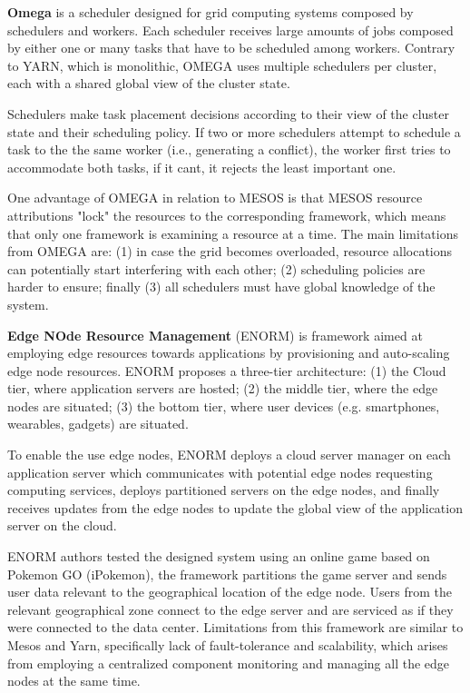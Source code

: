 \textbf{Omega} \cite{41684} is a scheduler designed for grid computing systems composed by schedulers and workers. Each scheduler receives large amounts of jobs composed by either one or many tasks that have to be scheduled among workers. Contrary to YARN, which is monolithic, OMEGA uses multiple schedulers per cluster, each with a shared global view of the cluster state.

Schedulers make task placement decisions according to their view of the cluster state and their scheduling policy. If two or more schedulers attempt to schedule a task to the the same worker (i.e., generating a conflict), the worker first tries to accommodate both tasks, if it cant, it rejects the least important one.

One advantage of OMEGA in relation to MESOS is that MESOS resource attributions "lock" the resources to the corresponding framework,  which means that only one framework is examining a resource at a time. The main limitations from OMEGA are: (1) in case the grid becomes overloaded, resource allocations can potentially start interfering with each other; (2) scheduling policies are harder to ensure; finally (3) all schedulers must have global knowledge of the system.

\textbf{Edge NOde Resource Management} \cite{wang2017enorm} (ENORM) is framework aimed at employing edge resources towards applications by provisioning and auto-scaling edge node resources. ENORM proposes a three-tier architecture: (1) the Cloud tier, where application servers are hosted; (2) the middle tier, where the edge nodes are situated; (3) the bottom tier, where user devices (e.g. smartphones, wearables, gadgets) are situated. 

To enable the use edge nodes, ENORM deploys a cloud server manager on each application server which communicates with potential edge nodes requesting computing services, deploys partitioned servers on the edge nodes, and finally receives updates from the edge nodes to update the global view of the application server on the cloud.

ENORM authors tested the designed system using an online game based on Pokemon GO (iPokemon)\cite{pokemonGo}, the framework partitions the game server and sends user data relevant to the geographical location of the edge node. Users from the relevant geographical zone connect to the edge server and are serviced as if they were connected to the data center. Limitations from this framework are similar to Mesos and Yarn, specifically lack of fault-tolerance and scalability, which arises from employing a centralized component monitoring and managing all the edge nodes at the same time. 


